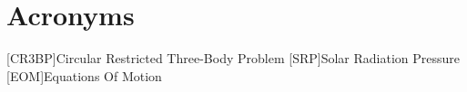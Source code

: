 \chapter*{Acronyms}

\begin{acronym}[CR3BP]
  [CR3BP]{Circular Restricted Three-Body Problem}
  [SRP]{Solar Radiation Pressure}
  [EOM]{Equations Of Motion}
\end{acronym}
